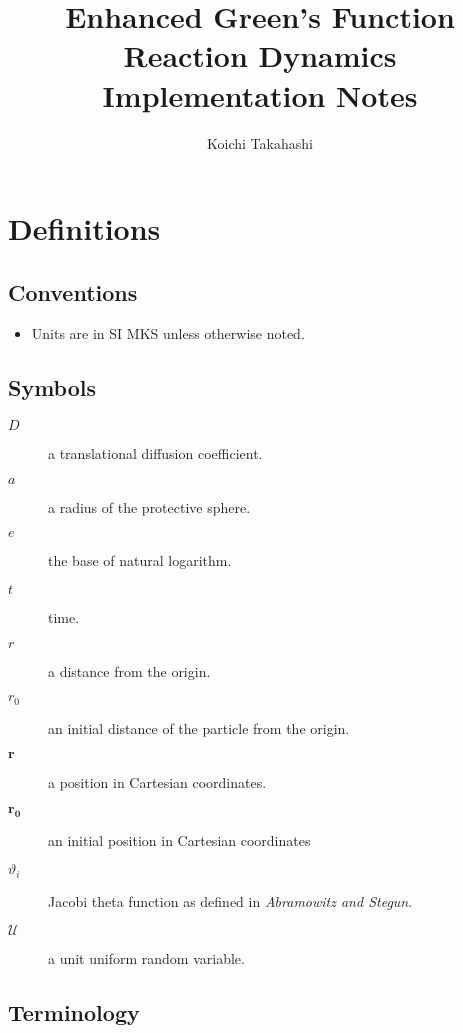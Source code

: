 \documentclass[english]{article}
\begin{document}
\title{Enhanced Green's Function Reaction Dynamics Implementation Notes}


\author{Koichi Takahashi}

\maketitle

\section*{Definitions}


\subsection*{Conventions}

\begin{itemize}
\item Units are in SI MKS unless otherwise noted.
\end{itemize}

\subsection*{Symbols}

\begin{description}
\item [{$D$}] a translational diffusion coefficient.
\item [{$a$}] a radius of the protective sphere.
\item [{$e$}] the base of natural logarithm.
\item [{$t$}] time.
\item [{$r$}] a distance from the origin.
\item [{$r_{0}$}] an initial distance of the particle from the origin.
\item [{$\mathbf{r}$}] a position in Cartesian coordinates.
\item [{$\mathbf{r_{0}}$}] an initial position in Cartesian coordinates
\item [{\textmd{$\vartheta_{i}$}}] Jacobi theta function as defined in
\emph{Abramowitz and Stegun}.
\item [{$\mathcal{U}$}] a unit uniform random variable.
\end{description}

\subsection*{Terminology}
\end{document}
